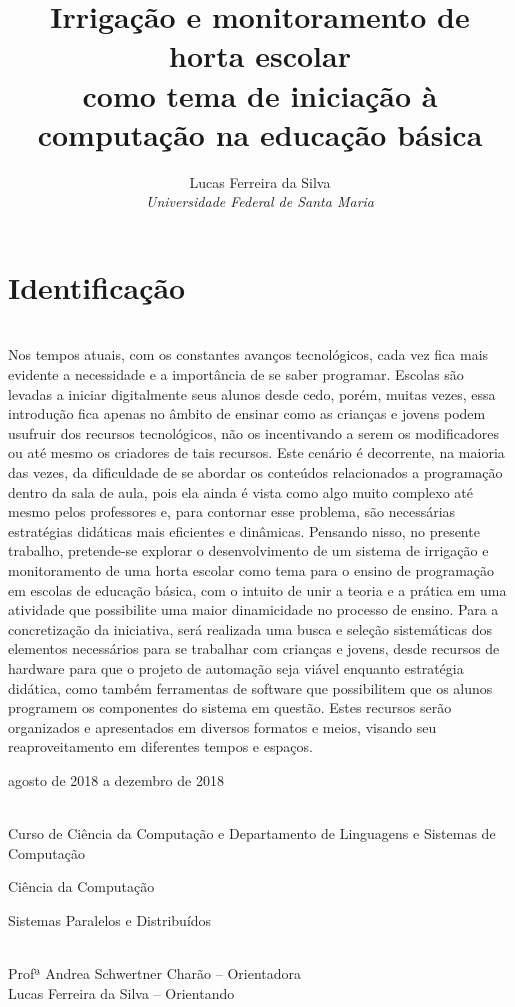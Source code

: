 \documentclass[12pt]{article}
\title{Irrigação e monitoramento de horta escolar\\ como tema de iniciação à computação na educação básica}
\author{Lucas Ferreira da Silva \\ \emph{Universidade Federal de Santa Maria}}
\begin{document}
	\maketitle
	
	\section{Identificação}
	
	\begin{description} \itemsep 0pt
		\item[Resumo:] ~\\
 Nos tempos atuais, com os constantes avanços tecnológicos, cada vez fica mais evidente a necessidade e a importância de se saber programar. Escolas são levadas a iniciar digitalmente seus alunos desde cedo, porém, muitas vezes, essa introdução fica apenas no âmbito de ensinar como as crianças e jovens podem usufruir dos recursos tecnológicos, não os incentivando a serem os modificadores ou até mesmo os criadores de tais recursos. Este cenário é decorrente, na maioria das vezes, da dificuldade de se abordar os conteúdos relacionados a programação dentro da sala de aula, pois ela ainda é vista como algo muito complexo até mesmo pelos professores e, para contornar esse problema, são necessárias estratégias didáticas mais eficientes e dinâmicas. Pensando nisso, no presente trabalho, pretende-se explorar o desenvolvimento de um sistema de irrigação e monitoramento de uma horta escolar como tema para o ensino de programação em escolas de educação básica, com o intuito de unir a teoria e a prática em uma atividade que possibilite uma maior dinamicidade no processo de ensino. Para a concretização da iniciativa, será realizada uma busca e seleção sistemáticas dos elementos necessários para se trabalhar com crianças e jovens, desde recursos de hardware para que o projeto de automação seja viável enquanto estratégia didática, como também ferramentas de software que possibilitem que os alunos programem os componentes do sistema em questão. Estes recursos serão organizados e apresentados em diversos formatos e meios, visando seu reaproveitamento em diferentes tempos e espaços.
	
		 
		\item[Período de execução:] agosto de 2018 a dezembro de 2018
		\item[Unidades participantes:] ~\\ Curso de Ciência da Computação e Departamento de Linguagens e Sistemas de Computação
        
		\item[Área de conhecimento:] Ciência da Computação
		\item[Linha de Pesquisa:] Sistemas Paralelos e Distribuídos
		\item[Participantes:] ~\\ Profª Andrea Schwertner Charão -- Orientadora \\ Lucas Ferreira da Silva -- Orientando
	\end{description}
	
\end{document}
